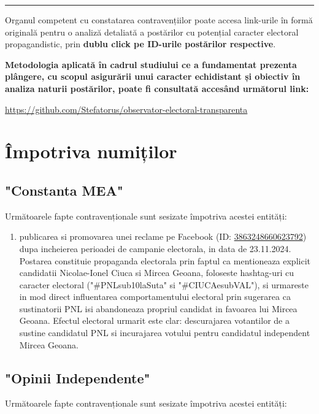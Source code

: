 \documentclass[a4paper,12pt]{article}
\begin{document}
\noindent\rule{\textwidth}{1pt}

Organul competent cu constatarea contravențiilor poate accesa link-urile în formă originală pentru o analiză detaliată a postărilor cu potențial caracter electoral propagandistic, prin \textbf{dublu click pe ID-urile postărilor respective}.

\textbf{Metodologia aplicată în cadrul studiului ce a fundamentat prezenta plângere, cu scopul asigurării unui caracter echidistant și obiectiv în analiza naturii postărilor, poate fi consultată accesând următorul link:}

\href{https://github.com/Stefatorus/observator-electoral-transparenta}{https://github.com/Stefatorus/observator-electoral-transparenta}

\newpage
\tableofcontents
\newpage

\section{Împotriva numiților}

\subsection{"Constanta MEA"}
Următoarele fapte contravenționale sunt sesizate împotriva acestei entități:

\begin{enumerate}[leftmargin=*, label=\arabic*.)]
    \item publicarea si promovarea unei reclame pe Facebook (ID: \href{https://www.facebook.com/ads/library/?id=3863248660623792}{3863248660623792}) dupa incheierea perioadei de campanie electorala, in data de 23.11.2024. Postarea constituie propaganda electorala prin faptul ca mentioneaza explicit candidatii Nicolae-Ionel Ciuca si Mircea Geoana, foloseste hashtag-uri cu caracter electoral ("\#PNLsub10laSuta" si "\#CIUCAesubVAL"), si urmareste in mod direct influentarea comportamentului electoral prin sugerarea ca sustinatorii PNL isi abandoneaza propriul candidat in favoarea lui Mircea Geoana. Efectul electoral urmarit este clar: descurajarea votantilor de a sustine candidatul PNL si incurajarea votului pentru candidatul independent Mircea Geoana.
\end{enumerate}

\vspace{0.5cm}

\subsection{"Opinii Independente"}
Următoarele fapte contravenționale sunt sesizate împotriva acestei entități:
\end{document}
